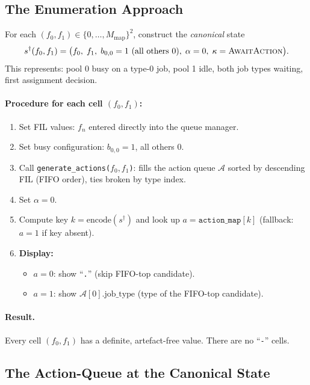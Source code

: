 \documentclass[11pt,a4paper]{article}
\begin{document}
\subsection{The Enumeration Approach}

For each $(f_0, f_1) \in \{0,\ldots,M_\text{map}\}^2$, construct the
\emph{canonical} state
\begin{equation}
  s^\dagger(f_0, f_1)
  = \bigl(f_0,\; f_1,\; b_{0,0} = 1 \text{ (all others 0)},\;
    \alpha = 0,\; \kappa = \textsc{AwaitAction}\bigr).
  \label{eq:canonical}
\end{equation}
This represents: pool 0 busy on a type-0 job, pool 1 idle, both job types
waiting, first assignment decision.

\paragraph{Procedure for each cell $(f_0, f_1)$:}
\begin{enumerate}
  \item Set FIL values: $f_n$ entered directly into the queue manager.
  \item Set busy configuration: $b_{0,0} = 1$, all others 0.
  \item Call \texttt{generate\_actions($f_0, f_1$)}: fills the action queue
        $\mathcal{A}$ sorted by descending FIL (FIFO order), ties broken by
        type index.
  \item Set $\alpha = 0$.
  \item Compute key $k = \text{encode}(s^\dagger)$ and look up
        $a = \texttt{action\_map}[k]$ (fallback: $a = 1$ if key absent).
  \item \textbf{Display:}
    \begin{itemize}
      \item $a = 0$: show ``\texttt{.}'' (skip FIFO-top candidate).
      \item $a = 1$: show $\mathcal{A}[0].\text{job\_type}$
            (type of the FIFO-top candidate).
    \end{itemize}
\end{enumerate}

\paragraph{Result.}  Every cell $(f_0, f_1)$ has a definite, artefact-free
value.  There are no ``\texttt{-}'' cells.

\subsection{The Action-Queue at the Canonical State}
\end{document}
